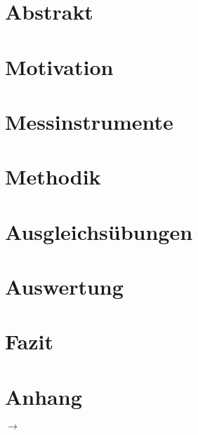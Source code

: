 





\setcounter{page}{2}

\section*{\centering Abstrakt}

\clearpage



\tableofcontents %
\clearpage

\listoffigures
\listoftables
\clearpage

\setcounter{section}{0}



\section{Motivation}


\section{Messinstrumente}


\section{Methodik}


\section{Ausgleichsübungen}


\section{Auswertung}

\section{Fazit}


\clearpage
{}
\printbibliography

\clearpage
{}
\appendix

\section*{Anhang}
$\rightarrow$
% 


